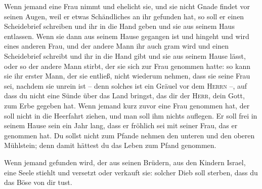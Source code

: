  Wenn jemand eine Frau nimmt und ehelicht sie, und sie
nicht Gnade findet vor seinen Augen, weil er etwas Schändliches an ihr
gefunden hat, so soll er einen Scheidebrief schreiben und ihr in die
Hand geben und sie aus seinem Haus entlassen.  Wenn sie
dann aus seinem Hause gegangen ist und hingeht und wird eines anderen
Frau,  und der andere Mann ihr auch gram wird und einen
Scheidebrief schreibt und ihr in die Hand gibt und sie aus seinem Hause
lässt, oder so der andere Mann stirbt, der sie sich zur Frau genommen
hatte:  so kann sie ihr erster Mann, der sie entließ,
nicht wiederum nehmen, dass sie seine Frau sei, nachdem sie unrein ist
-- denn solches ist ein Gräuel vor dem \textsc{Herrn} --, auf dass du
nicht eine Sünde über das Land bringst, das dir der \textsc{Herr}, dein
Gott, zum Erbe gegeben hat.  Wenn jemand kurz zuvor eine
Frau genommen hat, der soll nicht in die Heerfahrt ziehen, und man soll
ihm nichts auflegen. Er soll frei in seinem Hause sein ein Jahr lang,
dass er fröhlich sei mit seiner Frau, das er genommen hat.
 Du sollst nicht zum Pfande nehmen den unteren und den
oberen Mühlstein; denn damit hättest du das Leben zum Pfand genommen.

 Wenn jemand gefunden wird, der aus seinen Brüdern, aus
den Kindern Israel, eine Seele stiehlt und versetzt oder verkauft sie:
solcher Dieb soll sterben, dass du das Böse von dir tust.

